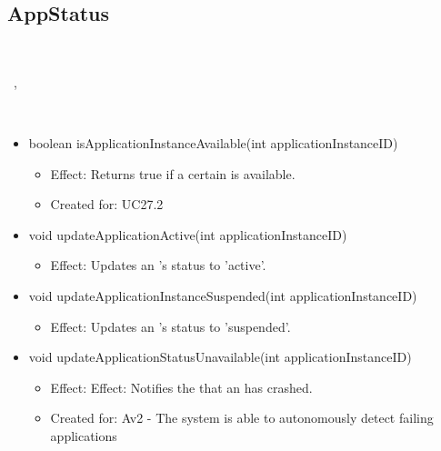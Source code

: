   \subsection{AppStatus}\label{int:OnlineServiceOnlineServiceApplicationManagerApplicationContainerMonitorAppStatus}
    \begin{description}
      \item[Provided by:] \iconcomponent{}~
      \item[Required by:] \iconcomponent{}~, \iconcomponent{}~
      \item[Operations:] ~
    \begin{itemize}[noitemsep,nolistsep,leftmargin=-.25cm]
      \item \textsf{boolean isApplicationInstanceAvailable(int applicationInstanceID)}
        \begin{itemize}[noitemsep,nolistsep]
           \item Effect: Returns true if a certain  is available.
\item Created for: UC27.2
        \end{itemize}
      \item \textsf{void updateApplicationActive(int applicationInstanceID)}
        \begin{itemize}[noitemsep,nolistsep]
           \item Effect: Updates an 's status to 'active'.
        \end{itemize}
      \item \textsf{void updateApplicationInstanceSuspended(int applicationInstanceID)}
        \begin{itemize}[noitemsep,nolistsep]
           \item Effect: Updates an 's status to 'suspended'.
        \end{itemize}
      \item \textsf{void updateApplicationStatusUnavailable(int applicationInstanceID)}
        \begin{itemize}[noitemsep,nolistsep]
           \item Effect: Effect: Notifies the  that an  has crashed.
\item Created for: Av2 - The system is able to autonomously detect failing applications
        \end{itemize}
    \end{itemize}
    \end{description}

